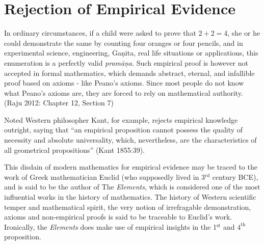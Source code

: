 \section*{Rejection of Empirical Evidence}

In ordinary circumstances, if a child were asked to prove that $2 + 2 = 4$, she or he could demonstrate the same by counting four oranges or four pencils, and in experimental science, engineering, Gaṇita, real life situations or applications, this enumeration is a perfectly valid {\sl pramāṇa}. Such empirical proof is however not accepted in formal mathematics, which demands abstract, eternal, and infallible proof based on axioms - like Peano’s axioms. Since most people do not know what Peano’s axioms are, they are forced to rely on mathematical authority. (Raju 2012: Chapter 12, Section 7)

Noted Western philosopher Kant, for example, rejects empirical knowledge outright, saying that ``an empirical proposition cannot possess the quality of necessity and absolute universality, which, nevertheless, are the characteristics of all geometrical propositions'' (Kant 1855:39). 

This disdain of modern mathematics for empirical evidence may be traced to the work of Greek mathematician Euclid (who supposedly lived in 3$^{\text{rd}}$ century BCE), and is said to be the author of The {\sl Elements}, which is considered one of the most influential works in the history of mathematics. The history of Western scientific temper and mathematical spirit, the very notion of irrefragable demonstration, axioms and non-empirical proofs is said to be traceable to Euclid’s work. Ironically, the {\sl Elements} does make use of empirical insights in the  1$^{\text{st}}$ and $4^{\text{th}}$ proposition.

